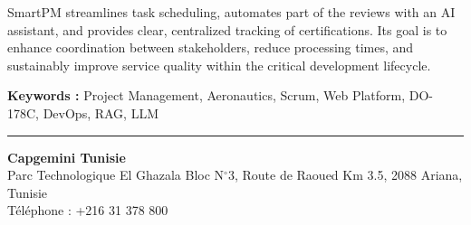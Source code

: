 SmartPM streamlines task scheduling, automates part of the reviews with an AI assistant, and provides clear, centralized tracking of certifications. Its goal is to enhance coordination between stakeholders, reduce processing times, and sustainably improve service quality within the critical development lifecycle.

\vspace{0.4cm}
\noindent\textbf{Keywords :} Project Management, Aeronautics, Scrum, Web Platform, DO-178C, DevOps, RAG, LLM

\vspace*{\fill}

\noindent\rule{\textwidth}{1pt}
\begin{center}
\textbf{Capgemini Tunisie}\\
Parc Technologique El Ghazala Bloc N$^\circ$3, Route de Raoued Km 3.5, 2088 Ariana, Tunisie \\
T\'el\'ephone : +216 31 378 800
\end{center}
